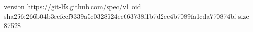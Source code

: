 version https://git-lfs.github.com/spec/v1
oid sha256:266b04b3ecfccf9339a5c0328624ec663738f1b7d2ec4b7089fa1cda770874bf
size 87528
